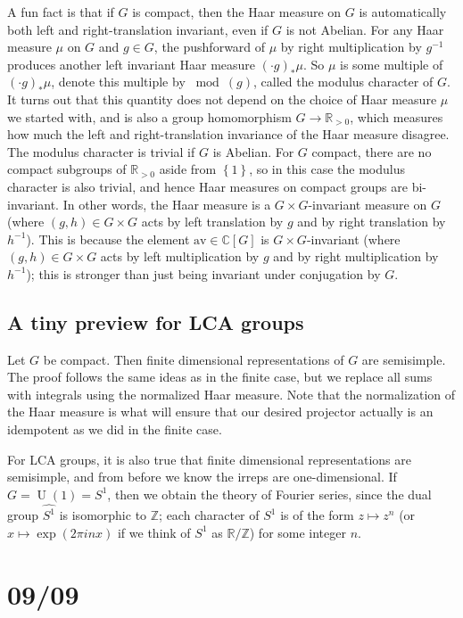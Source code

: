 \documentclass[11pt,leqno]{article}
\theoremstyle{plain}
\theoremstyle{definition}
\numberwithin{equation}{section}
\numberwithin{lem}{section}
\newcommand{\cbr}[1]{\left\{#1\right\}}
\DeclareMathOperator{\U}{U}
\newcommand{\av}{\mathrm{av}}
\begin{document}
A fun fact is that if $G$ is compact, then the Haar measure on $G$ is automatically both left and right-translation invariant, even if $G$ is not Abelian. For any Haar measure $\mu$ on $G$ and $g\in G$, the pushforward of $\mu$ by right multiplication by $g^{-1}$ produces another left invariant Haar measure $(\cdot g)_\ast\mu$. So $\mu$ is some multiple of $(\cdot g)_\ast\mu$, denote this multiple by $\bmod(g)$, called the modulus character of $G$. It turns out that this quantity does not depend on the choice of Haar measure $\mu$ we started with, and is also a group homomorphism $G\to \mathbb R_{>0}$, which measures how much the left and right-translation invariance of the Haar measure disagree. The modulus character is trivial if $G$ is Abelian. For $G$ compact, there are no compact subgroups of $\mathbb R_{>0}$ aside from $\cbr{1}$, so in this case the modulus character is also trivial, and hence Haar measures on compact groups are bi-invariant. In other words, the Haar measure is a $G\times G$-invariant measure on $G$ (where $(g,h)\in G\times G$ acts by left translation by $g$ and by right translation by $h^{-1}$). This is because the element $\av\in\mathbb C[G]$ is $G\times G$-invariant (where $(g,h)\in G\times G$ acts by left multiplication by $g$ and by right multiplication by $h^{-1}$); this is stronger than just being invariant under conjugation by $G$.

\subsection{A tiny preview for LCA groups}
Let $G$ be compact. Then finite dimensional representations of $G$ are semisimple. The proof follows the same ideas as in the finite case, but we replace all sums with integrals using the normalized Haar measure. Note that the normalization of the Haar measure is what will ensure that our desired projector actually is an idempotent as we did in the finite case.

For LCA groups, it is also true that finite dimensional representations are semisimple, and from before we know the irreps are one-dimensional. If $G = \U(1) = S^1$, then we obtain the theory of Fourier series, since the dual group $\widehat{S^1}$ is isomorphic to $\mathbb Z$; each character of $S^1$ is of the form $z\mapsto z^n$ (or $x\mapsto \exp(2\pi i nx)$ if we think of $S^1$ as $\mathbb R/\mathbb Z$) for some integer $n$.

\newpage\section{09/09}
\end{document}
